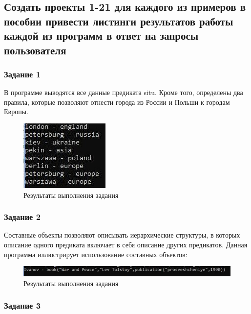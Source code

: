 \documentclass[14pt,a4paper,report]{report}
\begin{document}
\subsection{Создать проекты 1-21 для каждого из примеров в пособии привести листинги результатов работы каждой из программ в ответ на запросы пользователя}

\subsubsection{Задание 1}

В программе выводятся все данные предиката situ. Кроме того, определены два правила, которые позволяют отнести города из России и Польши к городам Европы. 



\begin{figure}[h!]
	\centering
	\includegraphics[scale = 1.0]{images/d1.jpeg}
	\caption{Результаты выполнения задания}
\end{figure}

\subsubsection{Задание 2}

Составные объекты позволяют описывать иерархические структуры, в которых описание одного предиката включает в себя описание других предикатов. Данная программа иллюстрирует использование составных объектов:



\begin{figure}[h!]
	\centering
	\includegraphics[scale = 1.0]{images/d2.jpeg}
	\caption{Результаты выполнения задания}
\end{figure}

\subsubsection{Задание 3}
\end{document}
